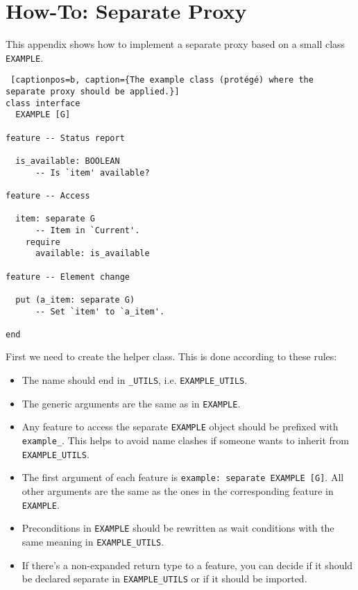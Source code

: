 \section{How-To: Separate Proxy}
\label{sec:howto-separate-proxy}

This appendix shows how to implement a separate proxy based on a small class \lstinline!EXAMPLE!.

\begin{lstlisting} [captionpos=b, caption={The example class (protégé) where the separate proxy should be applied.}]
class interface
  EXAMPLE [G]

feature -- Status report

  is_available: BOOLEAN
      -- Is `item' available?
  
feature -- Access

  item: separate G
      -- Item in `Current'.
    require
      available: is_available

feature -- Element change

  put (a_item: separate G)
      -- Set `item' to `a_item'.

end
\end{lstlisting}

First we need to create the helper class.
This is done according to these rules:
 \begin{itemize}
  \item The name should end in \lstinline!_UTILS!, i.e. \lstinline!EXAMPLE_UTILS!.
  \item The generic arguments are the same as in \lstinline!EXAMPLE!.
  \item Any feature to access the separate \lstinline!EXAMPLE! object should be prefixed with \lstinline!example_!.
  This helps to avoid name clashes if someone wants to inherit from \lstinline!EXAMPLE_UTILS!.
  \item The first argument of each feature is \lstinline!example: separate EXAMPLE [G]!.
  All other arguments are the same as the ones in the corresponding feature in \lstinline!EXAMPLE!.
  \item Preconditions in \lstinline!EXAMPLE! should be rewritten as wait conditions with the same meaning in \lstinline!EXAMPLE_UTILS!.
  \item If there's a non-expanded return type to a feature, you can decide if it should be declared separate in \lstinline!EXAMPLE_UTILS! or if it should be imported.
 \end{itemize}

